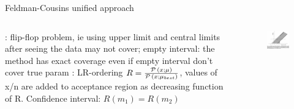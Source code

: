 \documentclass[asd-beamer.tex]{subfiles}%
\begin{document}
\begin{frame}{Feldman-Cousins unified approach}\frameintoc
\begin{columns}[T]
\begin{column}{0.5\textwidth}
: flip-flop problem, ie using upper limit and central limits after seeing the data may not cover; empty interval: the method has exact coverage even if empty interval don't cover true param
: LR-ordering $R=\frac{\operatorname{\mathcal{P}}{(x;\mu)}}{\operatorname{\mathcal{P}}{(x;\mu_{best})}}$, values of x/n are added to acceptance region as decreasing function of R.
Confidence interval: $R(m_1)=R(m_2)$
\end{column}
\begin{column}{0.5\textwidth}
\begin{figure}[!ht]\includegraphics[trim={0cm 0cm 0 0},clip, keepaspectratio,height=0.49\textheight]{figures/james/estimators/flipflopping}\label{fig:flipflopping}\end{figure}
\end{column}
\end{columns}

\end{frame}
\end{document}
